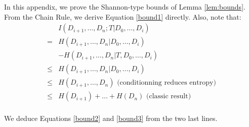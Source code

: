 \begin{appendix}
    In this appendix, we prove the Shannon-type bounds of Lemma
\ref{lem:bounds}. From the Chain Rule, we derive Equation \ref{bound1}
directly.  Also, note that:
\begin{equation*}
\begin{split}
         & I(D_{i+1}, \ldots, D_n ; T | D_0, \ldots , D_i) \\
    =    & H(D_{i+1}, \ldots, D_n | D_0, \ldots , D_i) \\
         & - H(D_{i+1}, \ldots, D_n | T , D_0, \ldots , D_i)\\
    \leq & H(D_{i+1}, \ldots, D_n | D_0, \ldots , D_i) \\
    \leq & H(D_{i+1}, \ldots, D_n) \text{  (conditionning reduces entropy)}\\
    \leq & H(D_{i+1}) +  \ldots +H( D_n) \text{  (classic result)}\\
\end{split}
\end{equation*}

We deduce Equations \ref{bound2} and \ref{bound3} from the two last lines.


\end{appendix}
